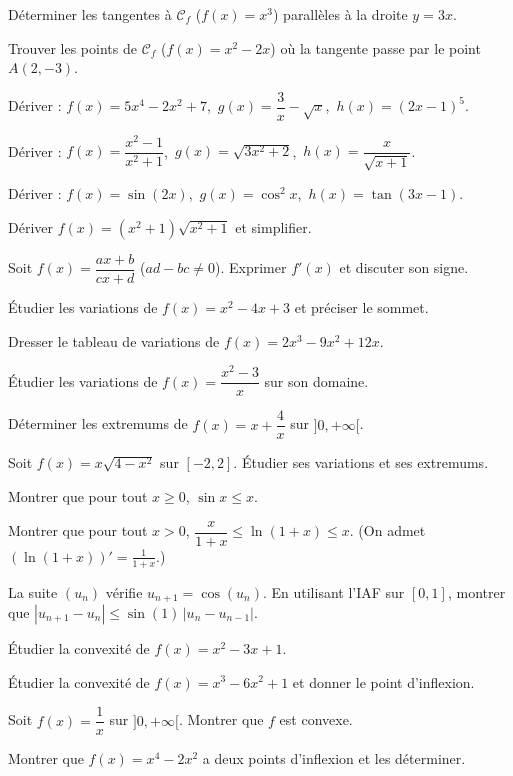\exo{} Déterminer les tangentes à $\mathcal C_f$ ($f(x)=x^{3}$) parallèles à la droite $y=3x$.

\exo{} Trouver les points de $\mathcal C_f$ ($f(x)=x^{2}-2x$) où la tangente passe par le point $A(2,-3)$.

\exo{} Dériver : $f(x)=5x^{4}-2x^{2}+7$,\ $g(x)=\dfrac{3}{x}-\sqrt{x}$,\ $h(x)=(2x-1)^{5}$.

\exo{} Dériver : $f(x)=\dfrac{x^{2}-1}{x^{2}+1}$,\ $g(x)=\sqrt{3x^{2}+2}$,\ $h(x)=\dfrac{x}{\sqrt{x+1}}$.

\exo{} Dériver : $f(x)=\sin(2x)$,\ $g(x)=\cos^{2}x$,\ $h(x)=\tan(3x-1)$.

\exo{} Dériver $f(x)=(x^{2}+1)\sqrt{x^{2}+1}$ et simplifier.

\exo{} Soit $f(x)=\dfrac{ax+b}{cx+d}$ ($ad-bc\ne0$). Exprimer $f'(x)$ et discuter son signe.

\exo{} Étudier les variations de $f(x)=x^{2}-4x+3$ et préciser le sommet.

\exo{} Dresser le tableau de variations de $f(x)=2x^{3}-9x^{2}+12x$.

\exo{} Étudier les variations de $f(x)=\dfrac{x^{2}-3}{x}$ sur son domaine.

\exo{} Déterminer les extremums de $f(x)=x+\dfrac{4}{x}$ sur $]0,+\infty[$.

\exo{} Soit $f(x)=x\sqrt{4-x^{2}}$ sur $[-2,2]$. Étudier ses variations et ses extremums.

\exo{} Montrer que pour tout $x\ge0$, $\sin x\le x$.

\exo{} Montrer que pour tout $x>0$, $\dfrac{x}{1+x}\le\ln(1+x)\le x$. (On admet $(\ln(1+x))'=\tfrac1{1+x}$.)

\exo{} La suite $(u_n)$ vérifie $u_{n+1}=\cos(u_n)$. En utilisant l'IAF sur $[0,1]$, montrer que $|u_{n+1}-u_n|\le \sin(1)\,|u_n-u_{n-1}|$.

\exo{} Étudier la convexité de $f(x)=x^{2}-3x+1$.

\exo{} Étudier la convexité de $f(x)=x^{3}-6x^{2}+1$ et donner le point d'inflexion.

\exo{} Soit $f(x)=\dfrac1x$ sur $]0,+\infty[$. Montrer que $f$ est convexe.

\exo{} Montrer que $f(x)=x^{4}-2x^{2}$ a deux points d'inflexion et les déterminer.

